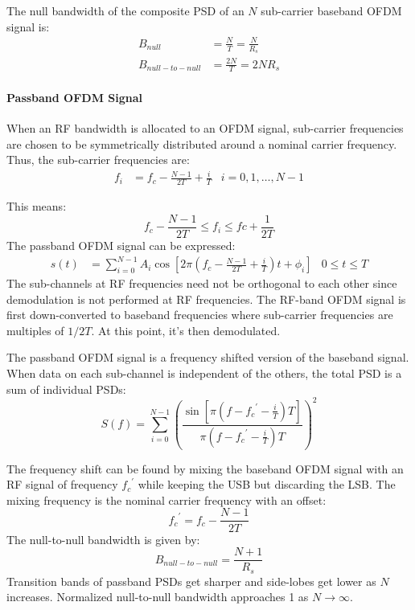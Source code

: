 The null bandwidth of the composite \gls{PSD} of an \(N\) sub-carrier baseband OFDM signal is:
\begin{align*}
	B_{null} &= \frac{N}{T} = \frac{N}{R_s} \\
	B_{null-to-null} &= \frac{2N}{T} = 2NR_s
\end{align*}

\paragraph{Passband OFDM Signal}

When an \gls{RF} bandwidth is allocated to an OFDM signal, sub-carrier frequencies are chosen to be symmetrically distributed around a nominal carrier frequency. Thus, the sub-carrier frequencies are:
\begin{align*}
	f_i &= f_c - \frac{N-1}{2T} + \frac{i}{T} & i = 0,1,\ldots,N-1
\end{align*}
\begin{mathDef}
\end{mathDef}
This means:
\[
	f_c - \frac{N-1}{2T} \leq f_i \leq fc + \frac{1}{2T}
\]
The passband OFDM signal can be expressed:
\begin{align*}
	s(t) &= \sum_{i=0}^{N-1} A_i \cos \left[ 2\pi \left( f_c - \frac{N-1}{2T} + \frac{i}{T}\right)t + \phi_i \right] & 0 \leq t \leq T
\end{align*}
The sub-channels at \gls{RF} frequencies need not be orthogonal to each other since demodulation is not performed at RF frequencies\cite{fuqin}. The RF-band OFDM signal is first down-converted to baseband frequencies where sub-carrier frequencies are multiples of \(1/2T\)\cite{fuqin}. At this point, it's then demodulated.

The passband OFDM signal is a frequency shifted version of the baseband signal. When data on each sub-channel is independent of the others, the total \gls{PSD} is a sum of individual PSDs:
\[
	S(f) = \sum_{i=0}^{N-1} \left( \frac{\sin \left[ \pi(f - {f_c}^\prime - \frac{i}{T})T \right]}{\pi(f - {f_c}^\prime - \frac{i}{T})T} \right)^2
\]
\begin{mathDef}
\end{mathDef}
The frequency shift can be found by mixing the baseband OFDM signal with an \gls{RF} signal of frequency \({f_c}^\prime\) while keeping the \gls{USB} but discarding the \gls{LSB}. The mixing frequency is the nominal carrier frequency with an offset:
\[
	{f_c}^\prime = f_c - \frac{N-1}{2T}
\]
The null-to-null bandwidth is given by:
\[
	B_{null-to-null} = \frac{N + 1}{R_s}
\]
Transition bands of passband PSDs get sharper and side-lobes get lower as \(N\) increases. Normalized null-to-null bandwidth approaches 1 as \(N\to\infty\)\cite{fuqin}.

